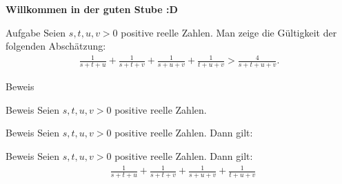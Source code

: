 \documentclass[10pt]{beamer}
\title{}
\author{Artur's \( \oint \) Mathematikstübchen}
\date{}
\begin{document}

\begin{frame}
    \begin{center}
        \textbf{\huge Willkommen in der guten Stube \newline \newline :D}
    \end{center}
\end{frame}




\begin{frame}
    \begin{alertblock}{Aufgabe}
        Seien \( s, t, u, v > 0 \) positive reelle Zahlen. Man zeige die Gültigkeit der folgenden Abschätzung:
        \begin{align*}
            \frac{1}{s + t + u} + \frac{1}{s + t + v} + \frac{1}{s + u + v} + \frac{1}{t + u + v}
            > \frac{4}{s + t + u + v}.
        \end{align*}
    \end{alertblock}
\end{frame}



\begin{frame}{Beweis}
    
\end{frame}



\begin{frame}{Beweis}
    Seien \( s, t, u, v > 0 \) positive reelle Zahlen.
\end{frame}



\begin{frame}{Beweis}
    Seien \( s, t, u, v > 0 \) positive reelle Zahlen. Dann gilt:
\end{frame}



\begin{frame}{Beweis}
    Seien \( s, t, u, v > 0 \) positive reelle Zahlen. Dann gilt:
    \begin{align*}
        & \frac{1}{s + t + u} + \frac{1}{s + t + v} + \frac{1}{s + u + v} + \frac{1}{t + u + v}
    \end{align*}
\end{frame}
\end{document}
